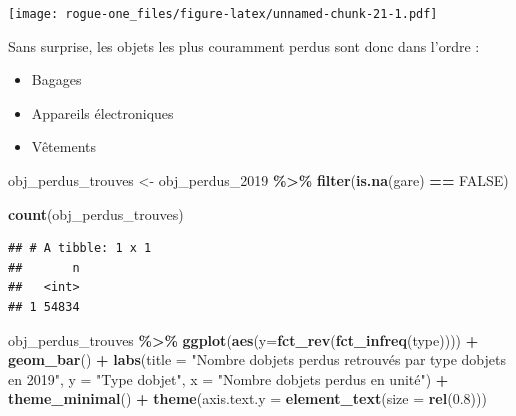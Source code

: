 \documentclass[
]{article}
\newenvironment{Shaded}{\begin{snugshade}}{\end{snugshade}}
\newcommand{\AttributeTok}[1]{\textcolor[rgb]{0.13,0.29,0.53}{#1}}
\newcommand{\ConstantTok}[1]{\textcolor[rgb]{0.56,0.35,0.01}{#1}}
\newcommand{\FloatTok}[1]{\textcolor[rgb]{0.00,0.00,0.81}{#1}}
\newcommand{\FunctionTok}[1]{\textcolor[rgb]{0.13,0.29,0.53}{\textbf{#1}}}
\newcommand{\NormalTok}[1]{#1}
\newcommand{\OtherTok}[1]{\textcolor[rgb]{0.56,0.35,0.01}{#1}}
\newcommand{\SpecialCharTok}[1]{\textcolor[rgb]{0.81,0.36,0.00}{\textbf{#1}}}
\newcommand{\StringTok}[1]{\textcolor[rgb]{0.31,0.60,0.02}{#1}}
\begin{document}
\texttt{[image: rogue-one\_files/figure-latex/unnamed-chunk-21-1.pdf]}

Sans surprise, les objets les plus couramment perdus sont donc dans
l'ordre :

\begin{itemize}
\item
  Bagages
\item
  Appareils électroniques
\item
  Vêtements
\end{itemize}

\begin{Shaded}
\begin{Highlighting}[]
\NormalTok{obj\_perdus\_trouves }\OtherTok{\textless{}{-}}\NormalTok{ obj\_perdus\_2019 }\SpecialCharTok{\%\textgreater{}\%}
  \FunctionTok{filter}\NormalTok{(}\FunctionTok{is.na}\NormalTok{(gare) }\SpecialCharTok{==} \ConstantTok{FALSE}\NormalTok{)}

\FunctionTok{count}\NormalTok{(obj\_perdus\_trouves)}
\end{Highlighting}
\end{Shaded}

\begin{verbatim}
## # A tibble: 1 x 1
##       n
##   <int>
## 1 54834
\end{verbatim}

\begin{Shaded}
\begin{Highlighting}[]
\NormalTok{obj\_perdus\_trouves }\SpecialCharTok{\%\textgreater{}\%} 
  \FunctionTok{ggplot}\NormalTok{(}\FunctionTok{aes}\NormalTok{(}\AttributeTok{y=}\FunctionTok{fct\_rev}\NormalTok{(}\FunctionTok{fct\_infreq}\NormalTok{(type)))) }\SpecialCharTok{+}
  \FunctionTok{geom\_bar}\NormalTok{() }\SpecialCharTok{+}
  \FunctionTok{labs}\NormalTok{(}\AttributeTok{title =} \StringTok{"Nombre d\textquotesingle{}objets perdus retrouvés par type d\textquotesingle{}objets en 2019"}\NormalTok{,}
       \AttributeTok{y =} \StringTok{"Type d\textquotesingle{}objet"}\NormalTok{,}
       \AttributeTok{x =} \StringTok{"Nombre d\textquotesingle{}objets perdus en unité"}\NormalTok{) }\SpecialCharTok{+}
  \FunctionTok{theme\_minimal}\NormalTok{() }\SpecialCharTok{+}
  \FunctionTok{theme}\NormalTok{(}\AttributeTok{axis.text.y =} \FunctionTok{element\_text}\NormalTok{(}\AttributeTok{size =} \FunctionTok{rel}\NormalTok{(}\FloatTok{0.8}\NormalTok{)))}
\end{Highlighting}
\end{Shaded}
\end{document}
